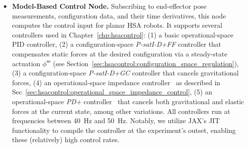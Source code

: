 \begin{itemize}
\begin{itemize}
        \item \textbf{Model-Based Control Node.} Subscribing to end-effector pose measurements, configuration data, and their time derivatives, this node computes the control input for planar \gls{HSA} robots. It supports several controllers used in Chapter~\ref{chp:hsacontrol}: (1) a basic operational-space PID controller, (2) a configuration-space \emph{P-satI-D+FF} controller that compensates static forces at the desired configuration via a steady-state actuation $\phi^\mathrm{ss}$ (see Section~\ref{sec:hsacontrol:configuration_space_regulation}), (3) a configuration-space \emph{P-satI-D+GC} controller that cancels gravitational forces, (4) an operational-space impedance controller~\citep{khatib1987unified} as described in Sec~\ref{sec:hsacontrol:operational_space_impedance_control}, (5) an operational-space \emph{PD+} controller~\citep{paden1988globally, ott2008cartesian, della2020model} that cancels both gravitational and elastic forces at the current state, among other variations. All controllers run at frequencies between \SI{40}{Hz} and \SI{50}{Hz}. Notably, we utilize JAX’s \gls{JIT} functionality to compile the controller at the experiment’s outset, enabling these (relatively) high control rates.

\end{itemize}
\end{itemize}
